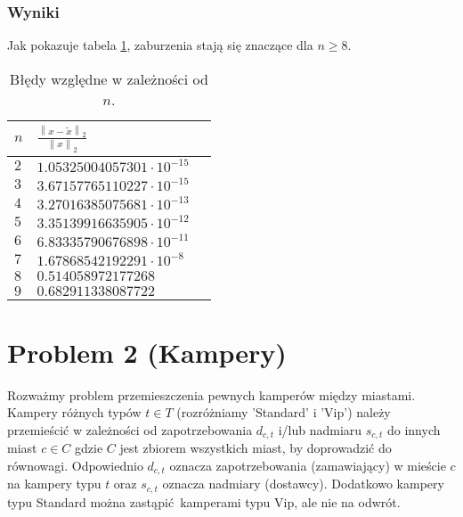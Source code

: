 \documentclass[a4paper,11pt]{article}
\theoremstyle{mytheor}
\begin{document}
\subsubsection*{Wyniki}
Jak pokazuje tabela \ref{table1}, zaburzenia stają się znaczące dla $n\geq8$.
\begin{table}
    \begin{center}
        \begin{tabular}{ |l|l|l| }
            \hline
            $n$ & $\frac{\left\|x - \widetilde{x}\right\|_2}{\left\|x\right\|_2}$ \\
            \hline
            $2$ & $1.05325004057301 \cdot 10^{-15}$                        \\
            \hline
            $3$ & $3.67157765110227 \cdot 10^{-15}$                        \\
            \hline
            $4$ & $3.27016385075681 \cdot 10^{-13}$                        \\
            \hline
            $5$ & $3.35139916635905 \cdot 10^{-12}$                        \\
            \hline
            $6$ & $6.83335790676898 \cdot 10^{-11}$                        \\
            \hline
            $7$ & $1.67868542192291 \cdot 10^{-8}$                         \\
            \hline
            $8$ & $0.514058972177268$                                      \\
            \hline
            $9$ & $0.682911338087722$                                      \\
            \hline
        \end{tabular}
        \caption{Błędy względne w zależności od $n$.}
        \label{table1}
    \end{center}
\end{table}

\section*{Problem 2 (Kampery)}
Rozważmy problem przemieszczenia pewnych kamperów między miastami. Kampery różnych typów $t\in T$ (rozróżniamy 'Standard' i 'Vip') należy przemieścić w zależności od zapotrzebowania $d_{c,t}$ i/lub nadmiaru $s_{c,t}$ do innych miast $c\in C$ gdzie $C$ jest zbiorem wszystkich miast, by doprowadzić do równowagi. Odpowiednio $d_{c,t}$ oznacza zapotrzebowania (zamawiający) w mieście $c$ na kampery typu $t$ oraz $s_{c,t}$ oznacza nadmiary (dostawcy). Dodatkowo kampery typu Standard można zastąpić kamperami typu Vip, ale nie na odwrót.
\end{document}
